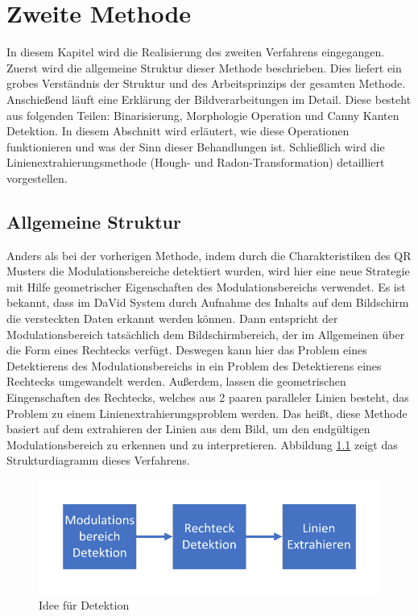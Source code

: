 \chapter{Zweite Methode} \label{cha:ZweiteMethode}

In diesem Kapitel wird die Realisierung des zweiten Verfahrens eingegangen. Zuerst wird die allgemeine Struktur dieser Methode beschrieben. Dies liefert ein grobes Verständnis der Struktur und des Arbeitsprinzips der gesamten Methode. Anschießend läuft eine Erklärung der Bildverarbeitungen im Detail. Diese besteht aus folgenden Teilen: Binarisierung, Morphologie Operation und Canny Kanten Detektion. In diesem Abschnitt wird erläutert, wie diese Operationen funktionieren und was der Sinn dieser Behandlungen ist. Schließlich wird die Linienextrahierungsmethode (Hough- und Radon-Transformation) detailliert vorgestellen. 

\section{Allgemeine Struktur} 

Anders als bei der vorherigen Methode, indem durch die  Charakteristiken des QR Musters die Modulationsbereiche detektiert wurden, wird hier eine neue Strategie mit Hilfe geometrischer Eigenschaften des Modulationsbereichs verwendet. Es ist bekannt, dass im DaVid System durch Aufnahme des Inhalts auf dem Bildschirm die versteckten Daten erkannt werden können. Dann entspricht der Modulationsbereich tatsächlich dem Bildschirmbereich, der im Allgemeinen über die Form eines Rechtecks verfügt. Deswegen kann hier das Problem eines Detektierens des Modulationsbereichs in ein Problem des Detektierens eines Rechtecks umgewandelt werden. Außerdem, lassen die geometrischen Eingenschaften des Rechtecks, welches aus 2 paaren paralleler Linien besteht, das Problem zu einem Linienextrahierungsproblem werden. Das heißt, diese Methode basiert auf dem extrahieren der Linien aus dem Bild, um den endgültigen Modulationsbereich zu erkennen und zu interpretieren. Abbildung \ref{fig:Strukturdiagramm für zweite Methode} zeigt das Strukturdiagramm dieses Verfahrens.

\begin{figure}[H]
 \centering 
 \includegraphics[keepaspectratio,width=1.0\textwidth]{images/4_ZweiteErfahrung/Strukturdiagramm.pdf}
 \caption{Idee für Detektion}
 \label{fig:Strukturdiagramm für zweite Methode}
\end{figure}


